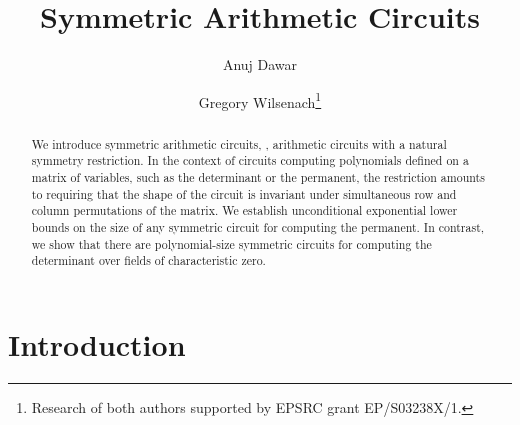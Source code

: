 \documentclass{toc}
\begin{document}
\begin{frontmatter}%

%
%
%

%
%

%
%

  \title{Symmetric Arithmetic Circuits}
%
%
%
%
%

%
%
%
%
%
%
%
%
%
%
%
%


%
%
%
%

%

\author[dawar]{Anuj Dawar}
\author[wilsenach]{Gregory Wilsenach\thanks{Research of both authors supported by EPSRC
    grant EP/S03238X/1.}}

%
%
%
%

%
%
%
%
%
%
%
%
\begin{abstract}
  We introduce symmetric arithmetic circuits, \ie, arithmetic circuits with a
natural symmetry restriction. In the context of circuits computing polynomials
defined on a matrix of variables, such as the determinant or the permanent, the
restriction amounts to requiring that the shape of the circuit is invariant
under simultaneous row and column permutations of the matrix.  We establish
unconditional exponential lower bounds on the size of any symmetric circuit
for computing the permanent.  In contrast, we show that there
are polynomial-size symmetric circuits for computing the determinant
over fields of characteristic zero.
\end{abstract}

%

\end{frontmatter}

%
%
%



\section{Introduction}\label{sec:introduction}
\end{document}
